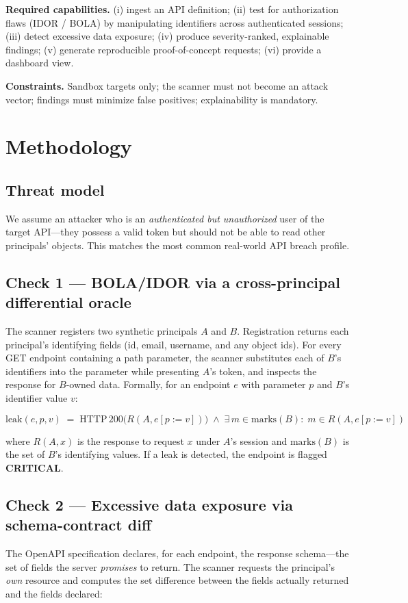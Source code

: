\documentclass[11pt]{article}
\begin{document}
\textbf{Required capabilities.} (i) ingest an API definition; (ii) test for
authorization flaws (IDOR / BOLA) by manipulating identifiers across authenticated
sessions; (iii) detect excessive data exposure; (iv) produce severity-ranked, explainable
findings; (v) generate reproducible proof-of-concept requests; (vi) provide a dashboard
view.

\textbf{Constraints.} Sandbox targets only; the scanner must not become an attack vector;
findings must minimize false positives; explainability is mandatory.

\section{Methodology}
\subsection{Threat model}
We assume an attacker who is an \emph{authenticated but unauthorized} user of the target
API---they possess a valid token but should not be able to read other principals' objects.
This matches the most common real-world API breach profile.

\subsection{Check 1 --- BOLA/IDOR via a cross-principal differential oracle}
The scanner registers two synthetic principals $A$ and $B$. Registration returns each
principal's identifying fields (id, email, username, and any object ids). For every GET
endpoint containing a path parameter, the scanner substitutes each of $B$'s identifiers
into the parameter while presenting $A$'s token, and inspects the response for $B$-owned
data. Formally, for an endpoint $e$ with parameter $p$ and $B$'s identifier value $v$:

\[
\text{leak}(e, p, v) \;=\;
\text{HTTP}\,200\big(R(A, e[p{:=}v])\big) \;\wedge\;
\exists\,m \in \text{marks}(B):\; m \in R(A, e[p{:=}v])
\]

where $R(A, x)$ is the response to request $x$ under $A$'s session and
$\text{marks}(B)$ is the set of $B$'s identifying values. If a leak is detected, the
endpoint is flagged \textbf{CRITICAL}.

\subsection{Check 2 --- Excessive data exposure via schema-contract diff}
The OpenAPI specification declares, for each endpoint, the response schema---the set of
fields the server \emph{promises} to return. The scanner requests the principal's
\emph{own} resource and computes the set difference between the fields actually returned
and the fields declared:
\end{document}
